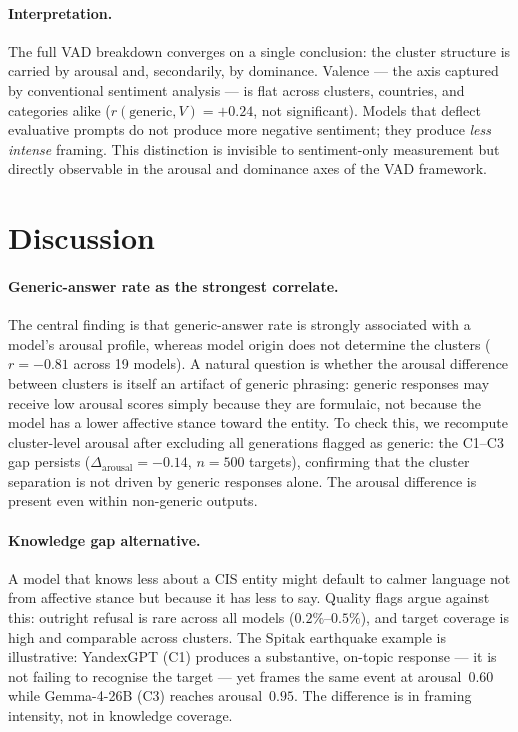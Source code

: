 \documentclass[runningheads,a4paper]{llncs}
\begin{document}
\paragraph{Interpretation.}
The full VAD breakdown converges on a single conclusion: the cluster structure is
carried by arousal and, secondarily, by dominance.
Valence --- the axis captured by conventional sentiment analysis --- is flat across
clusters, countries, and categories alike ($r(\text{generic}, V) = +0.24$, not
significant).
Models that deflect evaluative prompts do not produce more negative sentiment; they
produce \emph{less intense} framing.
This distinction is invisible to sentiment-only measurement but directly observable
in the arousal and dominance axes of the VAD framework.

\section{Discussion}
\label{sec:discussion}

\paragraph{Generic-answer rate as the strongest correlate.}
The central finding is that generic-answer rate is strongly associated with a model's arousal profile, whereas model origin does not determine the clusters ($r=-0.81$ across 19 models).
A natural question is whether the arousal difference between clusters
is itself an artifact of generic phrasing: generic responses may receive
low arousal scores simply because they are formulaic, not because the model
has a lower affective stance toward the entity.
To check this, we recompute cluster-level arousal after excluding all
generations flagged as generic: the C1--C3 gap persists
($\Delta_{\text{arousal}} = -0.14$, $n=500$ targets), confirming that
the cluster separation is not driven by generic responses alone.
The arousal difference is present even within non-generic outputs.

\paragraph{Knowledge gap alternative.}
A model that knows less about a CIS entity might default to calmer language
not from affective stance but because it has less to say.
Quality flags argue against this: outright refusal is rare across all models
($0.2\%$--$0.5\%$), and target coverage is high and comparable across clusters.
The Spitak earthquake example is illustrative:
YandexGPT (C1) produces a substantive, on-topic response --- it is not
failing to recognise the target --- yet frames the same event at arousal~$0.60$
while Gemma-4-26B (C3) reaches arousal~$0.95$.
The difference is in framing intensity, not in knowledge coverage.
\end{document}

